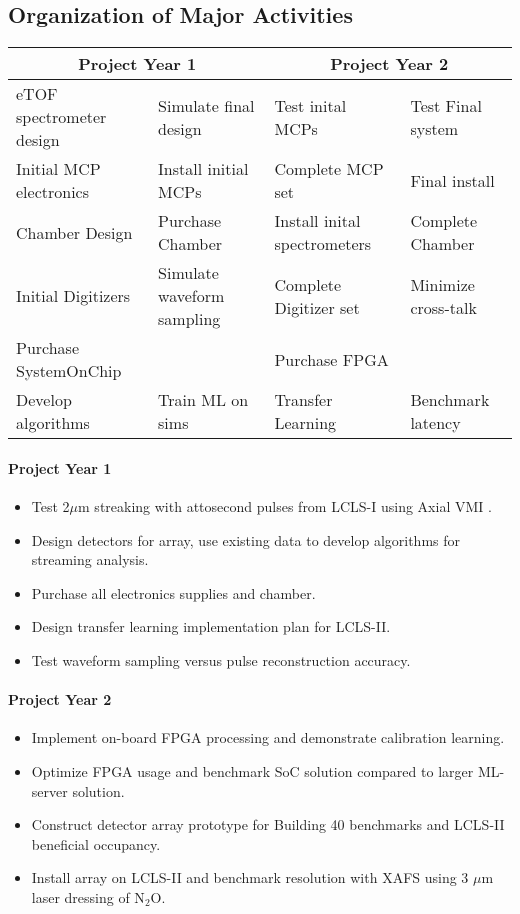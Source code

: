 \subsection*{Organization of Major Activities}
\small
\begin{tabular}{l|l|l|l}
\hline
\multicolumn{2}{c|}{Project Year 1} &  \multicolumn{2}{c}{Project Year 2} \\
\hline
eTOF spectrometer design & Simulate final design & Test inital MCPs & Test Final system\\
Initial MCP electronics & Install initial MCPs & Complete MCP set & Final install\\
Chamber Design & Purchase Chamber& Install inital spectrometers & Complete Chamber\\
Initial Digitizers & Simulate waveform sampling& Complete Digitizer set & Minimize cross-talk\\
\hline
Purchase SystemOnChip & & Purchase FPGA &\\
Develop algorithms& Train ML on sims & Transfer Learning & Benchmark latency\\
\hline
\end{tabular}
\normalsize


\paragraph*{Project Year 1}
\begin{itemize}
\item Test 2$\mu$m streaking with attosecond pulses from LCLS-I using Axial VMI \cite{Siqi2018}.
\item Design detectors for array, use existing data to develop algorithms for streaming analysis.
\item Purchase all electronics supplies and chamber.
\item Design transfer learning implementation plan for LCLS-II.
\item Test waveform sampling versus pulse reconstruction accuracy.
\end{itemize}

\paragraph*{Project Year 2}
\begin{itemize}
\item Implement on-board FPGA processing and demonstrate calibration learning.
\item Optimize FPGA usage and benchmark SoC solution compared to larger ML-server solution.
\item Construct detector array prototype for Building 40 benchmarks and LCLS-II beneficial occupancy.
\item Install array on LCLS-II and benchmark resolution with XAFS using 3 $\mu$m laser dressing of N$_2$O.
\end{itemize}

